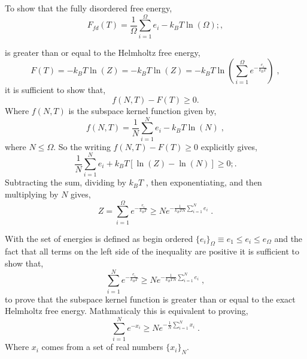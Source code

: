 \documentclass[onecolumn]{article}
\begin{document}
To show that the fully disordered free energy,
\begin{equation}
F_{fd}(T) = \frac{1}{\Omega}\sum_{i=1}^{\Omega}e_i  -  k_B T \ln(\Omega) ; ,
\end{equation}

is greater than or equal to the Helmholtz free energy, 
\begin{equation}
F(T) = -k_B T \ln(Z) = -k_B T \ln(Z) = -k_B T \ln(\sum_{i=1}^{\Omega} e^{-\frac{e_i}{k_BT}}) \;,
\end{equation}
it is sufficient to show that,
\begin{equation}
 f(N,T) - F(T) \geq 0. 
\end{equation}
Where $f(N,T)$ is the subspace kernel function given by, 
\begin{equation}
f(N,T) = \frac{1}{N}\sum_{i=1}^{N}e_i  -  k_B T \ln(N) \;,
\end{equation}
where $N\leq \Omega$.  
So the writing $f(N,T) - F(T) \geq 0$ explicitly gives,
\begin{equation}
\frac{1}{N}\sum_{i=1}^{N}e_i  +  k_B T [\ln(Z) -  \ln(N)] \geq 0  ;.
\end{equation}
Subtracting the  sum, dividing by $k_B T$ ,  then exponentiating, and then multiplying by $N$ gives, 
\begin{equation}
 Z = \sum_{i=1}^\Omega e^{-\frac{e_i}{k_B T}} \geq  N e^{-\frac{1}{k_B T N}\sum_{i=1}^{N}e_i} \;.
\end{equation}

With the set of energies is defined as begin ordered $\{e_i\}_{\Omega}\equiv e_1 \leq e_i \leq e_\Omega$ and the fact that all terms on the left side of the inequality are positive  it is sufficient to show that,
\begin{equation}
\sum_{i=1}^N e^{-\frac{e_i}{k_B T}} \geq  N e^{-\frac{1}{k_B T N}\sum_{i=1}^{N}e_i} \;,
\end{equation}
to prove that the subspace kernel function is greater than or equal to the exact Helmholtz free energy.  
Mathmaticaly this is equivalent to proving, 
\begin{equation}
\sum_{i=1}^N e^{-x_i} \geq  N e^{-\frac{1}{N}\sum_{i=1}^{N}x_i} \;.
\end{equation}
Where $x_i$ comes from a set of real numbers  $\{x_i\}_N$. 
\end{document}
